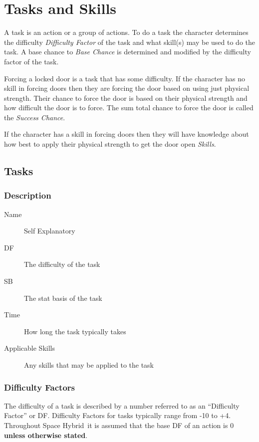 \chapter{Tasks and Skills}

A task is an action or a group of actions. To do a task the 
character determines the difficulty {\em Difficulty Factor} of the 
task and what skill(s) may be used to do the task. A base chance to 
{\em Base Chance} is determined and modified by the difficulty factor 
of the task. 

Forcing a locked door is a task that has some difficulty. If the 
character has no skill in forcing doors then they are forcing the 
door based on using just physical strength. Their chance to force the 
door is based on their physical strength and how difficult the door 
is to force. The sum total chance to force the door is called the 
{\em Success Chance}.

If the character has a skill in forcing doors then they will have 
knowledge about how best to apply their physical strength to get the 
door open {\em Skills}. 

\section{Tasks}

\subsection{Description}

\begin{description}
	\item[Name] 
	Self Explanatory
	\item[DF] The difficulty of the task
	\item[SB] The stat basis of the task
	\item[Time]
    How long the task typically takes
    \item[Applicable Skills]
    Any skills that may be applied to the task
\end{description}

\subsection{Difficulty Factors}

The difficulty of a task is described by a number 
referred to as an ``Difficulty Factor'' or DF. Difficulty Factors 
for tasks typically range from -10  to +4. Throughout Space Hybrid\ it is 
assumed that the base DF of an action is 0 {\bf unless otherwise 
stated}. 

